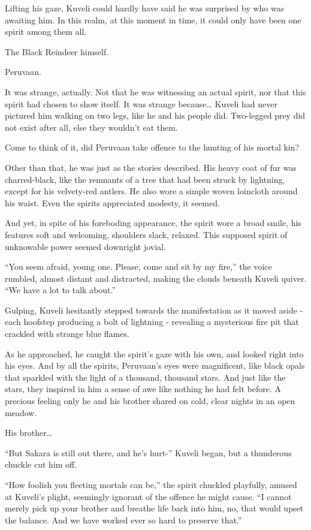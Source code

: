 Lifting his gaze, Kuveli could hardly have said he was surprised by who was awaiting him. In this realm, at this moment in time, it could only have been one spirit among them all.

The Black Reindeer himself.

Peruvaan.

It was strange, actually. Not that he was witnessing an actual spirit, nor that this spirit had chosen to show itself. It was strange because\ldots{} Kuveli had never pictured him walking on two legs, like he and his people did. Two-legged prey did not exist after all, else they wouldn't eat them.

Come to think of it, did Peruvaan take offence to the hunting of his mortal kin?

Other than that, he was just as the stories described. His heavy coat of fur was charred-black, like the remnants of a tree that had been struck by lightning, except for his velvety-red antlers. He also wore a simple woven loincloth around his waist. Even the spirits appreciated modesty, it seemed.

And yet, in spite of his foreboding appearance, the spirit wore a broad smile, his features soft and welcoming, shoulders slack, relaxed. This supposed spirit of unknowable power seemed downright jovial.

``You seem afraid, young one. Please, come and sit by my fire,'' the voice rumbled, almost distant and distracted, making the clouds beneath Kuveli quiver. ``We have a lot to talk about.''

Gulping, Kuveli hesitantly stepped towards the manifestation as it moved aside - each hoofstep producing a bolt of lightning - revealing a mysterious fire pit that crackled with strange blue flames.

As he approached, he caught the spirit's gaze with his own, and looked right into his eyes. And by all the spirits, Peruvaan's eyes were magnificent, like black opals that sparkled with the light of a thousand, thousand stars. And just like the stars, they inspired in him a sense of awe like nothing he had felt before. A precious feeling only he and his brother shared on cold, clear nights in an open meadow.

His brother\ldots{}

``But Sakara is still out there, and he's hurt-'' Kuveli began, but a thunderous chuckle cut him off.

``How foolish you fleeting mortals can be,'' the spirit chuckled playfully, amused at Kuveli's plight, seemingly ignorant of the offence he might cause. ``I cannot merely pick up your brother and breathe life back into him, no, that would upset the balance. And we have worked ever so hard to preserve that.''

